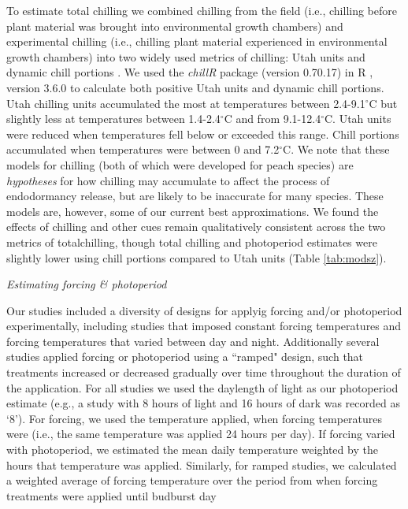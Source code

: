 \documentclass{article}
\begin{document}
\par To estimate total chilling we combined chilling from the field (i.e., chilling before plant material was brought into environmental growth chambers) and experimental chilling (i.e., chilling plant material experienced in environmental growth chambers) into two widely used metrics of chilling: Utah units and dynamic chill portions \citep{dennis2003}. We used the \textit{chillR} package (version 0.70.17) in R \citep{Rcore:2017, chillR2019}, version 3.6.0 to calculate both positive Utah units and dynamic chill portions. Utah chilling units accumulated the most at temperatures between 2.4-9.1$^{\circ}$C but slightly less at temperatures between 1.4-2.4$^{\circ}$C and from 9.1-12.4$^{\circ}$C. Utah units were reduced when temperatures fell below or exceeded this range. Chill portions accumulated when temperatures were between 0 and 7.2$^{\circ}$C. We note that these models for chilling (both of which were developed for peach species) are \emph{hypotheses} for how chilling may accumulate to affect the process of endodormancy release, but are likely to be inaccurate for many species. These models are, however, some of our current best approximations. We found the effects of chilling and other cues remain qualitatively consistent across the two metrics of totalchilling, though total chilling and photoperiod estimates were slightly lower using chill portions compared to Utah units (Table \ref{tab:modsz}).

\par{\emph{Estimating forcing \& photoperiod}}

Our studies included a diversity of designs for applyig forcing and/or photoperiod experimentally, including studies that imposed constant forcing temperatures and forcing temperatures that varied between day and night. Additionally several studies applied forcing or photoperiod using a ``ramped" design, such that treatments increased or decreased gradually over time throughout the duration of the application. For all studies we used the daylength of light as our photoperiod estimate (e.g., a study with 8 hours of light and 16 hours of dark was recorded as `8'). For forcing, we used the temperature applied, when forcing temperatures were (i.e., the same temperature was applied 24 hours per day). If forcing varied with photoperiod, we estimated the mean daily temperature weighted by the hours that temperature was applied. Similarly, for ramped studies, we calculated a weighted average of forcing temperature over the period from when forcing treatments were applied until budburst day
\end{document}
